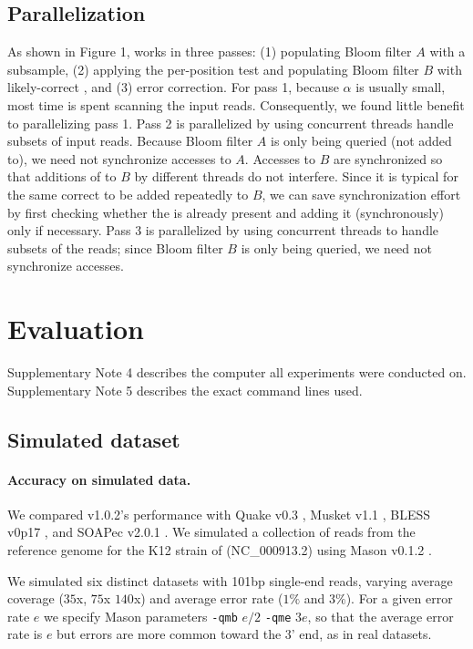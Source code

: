 \documentclass{bmcart}
\begin{document}
\subsection*{Parallelization} 
As shown in Figure 1, \tool works in three passes: (1) populating Bloom filter $A$ with a \kmer subsample, (2) applying the per-position test and populating Bloom filter $B$ with likely-correct \kmers, and (3) error correction.  For pass 1, because $\alpha$ is usually small, most time is spent scanning the input reads.  Consequently, we found little benefit to parallelizing pass 1.  Pass 2 is parallelized by using concurrent threads handle subsets of input reads.  Because Bloom filter $A$ is only being queried (not added to), we need not synchronize accesses to $A$.  Accesses to $B$ are synchronized so that additions of \kmers to $B$ by different threads do not interfere.  Since it is typical for the same correct \kmer to be added repeatedly to $B$, we can save synchronization effort by first checking whether the \kmer is already present and adding it (synchronously) only if necessary.  Pass 3 is parallelized by using concurrent threads to handle subsets of the reads; since Bloom filter $B$ is only being queried, we need not synchronize accesses.

\section*{Evaluation}

Supplementary Note 4 describes the computer all experiments were conducted on.  Supplementary Note 5 describes the exact command lines used.

\subsection*{Simulated dataset}

\paragraph{Accuracy on simulated data.} We compared \tool v1.0.2's performance with Quake v0.3 \cite{kelley2010quake}, Musket v1.1 \cite{liu2013musket}, BLESS v0p17 \cite{heo2014bless}, and SOAPec v2.0.1 \cite{luo2012soapdenovo2}.  We simulated a collection of reads from the reference genome for the K12 strain of \ecoli (NC\_000913.2) using Mason v0.1.2 \cite{holtgrewe2010mason}.  

We simulated six distinct datasets with 101bp single-end reads, varying average coverage ($35$x, $75$x $140$x) and average error rate ($1\%$ and $3\%$).  For a given error rate $e$ we specify Mason parameters \verb+-qmb+ $e/2$ \verb+-qme+ $3e$, so that the average error rate is $e$ but errors are more common toward the 3' end, as in real datasets.
\end{document}
